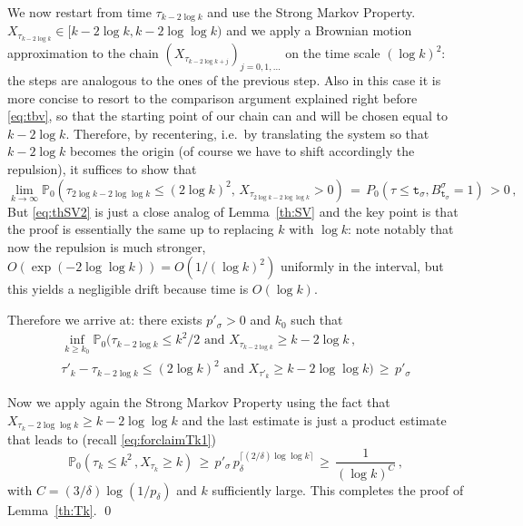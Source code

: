 \documentclass[reqno,11pt]{amsart}
\numberwithin{equation}{section}
\newcommand{\bbP}{{\ensuremath{\mathbb P}} }
\newcommand{\gd}{\delta}
\newcommand{\gs}{\sigma}
\begin{document}
\medskip

We now restart from time $ \tau_{k- 2 \log k}$ and use the Strong Markov Property. 
$X_{\tau_{k- 2 \log k}}\in [ k- 2 \log k, k-2 \log \log k)$  and we apply a Brownian motion 
approximation to the chain  $(X_{\tau_{k- 2 \log k+j}})_{j =0,1, \ldots}$ on the time scale $(\log k)^2$:
the steps are analogous to the ones of the previous step.
Also in this case it is 
  more concise to resort to the comparison argument explained right before \eqref{eq:tbv}, so that the starting point of our chain can and will be chosen equal to $k- 2 \log k$. 
  Therefore, by recentering,  i.e.\ by translating the system so that $k- 2 \log k$ becomes the origin (of course we have to shift accordingly the repulsion),  it suffices to show that 
\begin{equation}
\label{eq:thSV2}
\lim_{k \to \infty} 
\bbP_{0} \left( \tau_{ 2 \log k -2 \log \log k} \le (2 \log k)^2, \, X_{ \tau_{ 2 \log k -2 \log \log k} } >0 \right)\, =\,
P_0\left( \tau \le \mathtt t _\gs,
 B^\gs_{\mathtt t _\gs} =1\right)\,>0\,  ,
\end{equation}
But \eqref{eq:thSV2}
  is just  a close analog  of Lemma~\ref{th:SV}
 and the key point is that the proof is essentially the same up to replacing $k$ with $\log k$: note notably that now the repulsion is much stronger, $O(\exp(-2 \log \log k))= O( 1/ (\log k)^2)$ uniformly in the interval, but this yields a negligible drift because time is $O(\log k)$. 
 
 Therefore we arrive at: there exists $p'_\gs>0$ and $k_0$ such that 
 \begin{multline}
\label{eq:forclaimTk1.1}
\inf_{k \ge k_0}
\bbP_0\Big( \tau_{k- 2 \log k} \le  k^2 /2 \textrm { and } X_{ \tau_{k- 2 \log k}} \ge  k- 2 \log k
\, , \\
\tau'_k-\tau_{k-2 \log k} \le (2 \log k)^2 \text{ and } X_{\tau'_k} \ge k-2 \log \log k
\Big)\, \ge \, p'_\gs
\end {multline}
 

 Now we apply again the Strong Markov Property using the fact that $X_{\tau_k-2 \log \log k}\ge k -2 \log \log k$
 and the last estimate is just a product estimate that leads to (recall \eqref{eq:forclaimTk1})
 \begin{equation}
 \bbP_0\left( \tau_k \le k^2\, , X_{\tau_k} \ge k\right) \, \ge\, 
 p'_\gs \, p_\gd ^{\lceil (2/ \gd) \log \log k\rceil}\, \ge \, 
 \frac 1{(\log k)^C}\, ,
 \end{equation}
 with $C=(3/ \gd) \log(1/p_\gd)$ and $k$ sufficiently large. 
 This completes the proof of Lemma~\ref{th:Tk}.
 \qed
 
\end{document}
